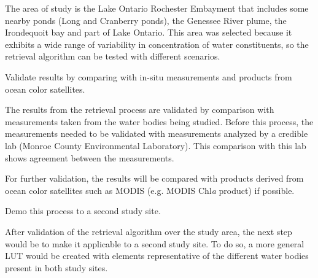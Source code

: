 \begin{enumerate}
The area of study is the Lake Ontario Rochester Embayment that includes some nearby ponds (Long and Cranberry ponds), the Genessee River plume, the Irondequoit bay and part of Lake Ontario. This area was selected because it exhibits a wide range of variability in concentration of water constituents, so the retrieval algorithm can be tested with different scenarios.
 
	{\bf \item Validate results by comparing with in-situ measurements and products from ocean color satellites.}

The results from the retrieval process are validated by comparison with measurements taken from the water bodies being studied. Before this process, the measurements needed to be validated with measurements analyzed by a credible lab (Monroe County Environmental Laboratory). This comparison with this lab shows agreement between the measurements. 

For further validation, the results will be compared with products derived from ocean color satellites such as MODIS (e.g. MODIS Chl{\it a} product) if possible.

	{\bf \item { Demo this process to a second study site}.}

After validation of the retrieval algorithm over the study area, the next step would be to make it applicable to a second study site. To do so, a more general LUT would be created with elements representative of the different water bodies present in both study sites.


\end{enumerate}


